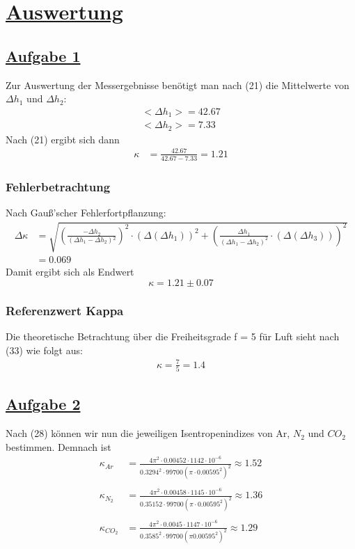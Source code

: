 \documentclass[11pt,a4paper]{article}
\begin{document}
  \section{\underline{Auswertung}}
\subsection{\underline{Aufgabe 1}}
Zur Auswertung der Messergebnisse benötigt man nach (21) die Mittelwerte von $\Delta h_{1} $ und $\Delta h_{2}$:
\begin{align*}
  <\Delta h_{1}> = 42.67 \\
  <\Delta h_{2}> = 7.33
\end{align*}
Nach (21) ergibt sich dann
\begin{align*}
  \kappa &= \frac{42.67}{42.67-7.33} = 1.21
\end{align*}
\subsubsection{Fehlerbetrachtung}
Nach Gauß'scher Fehlerfortpflanzung:
\begin{align*}
    \Delta \kappa &= \sqrt{{\left(\frac{- \Delta h_{2}}{{(\Delta h_{1}-\Delta
    h_{2})}{^2}}\right)}^{2} \cdot {(\Delta(\Delta h_{1}))}^{2}+{\left(\frac{\Delta
    h_{1}}{{(\Delta h_{1} - \Delta h_{2})}^{2}}\cdot (\Delta(\Delta h_{3}))\right)}^{2}}\\
&= 0.069
\end{align*}
Damit ergibt sich als Endwert
\begin{equation*}
  \kappa = 1.21 \pm 0.07
\end{equation*}

\subsubsection{Referenzwert Kappa}
Die theoretische Betrachtung über die Freiheitsgrade f = 5 für Luft sieht nach
(33) wie folgt aus:
\begin{align*}
    \kappa = \frac{7}{5} = 1.4
\end{align*}
\subsection{\underline{Aufgabe 2}}
 Nach (28) k\"onnen wir nun die jeweiligen Isentropenindizes von Ar, $N_{2}$ und $CO_{2}$
 bestimmen. Demnach ist 
 \begin{align*}
     {\kappa}_{Ar} &=\frac{4{\pi}^{2}\cdot0.00452\cdot1142\cdot{10}^{-6}}
     {{0.3294}^{2}\cdot99700{(\pi\cdot{0.00595}^{2})}^{2}} \approx 1.52 \\ \\
     {\kappa}_{{N}_{2}} &= \frac{4{\pi}^{2}\cdot0.00458\cdot1145\cdot{10}^{-6}}
     {{0.3515}{2}\cdot99700{(\pi\cdot{0.00595}^{2})}^{2}} \approx 1.36 \\ \\
     {\kappa}_{{CO}_{2}} &= \frac{4{\pi}^{2}\cdot0.0045\cdot1147\cdot{10}^{-6}}
     {{0.3585}^{2}\cdot99700{(\pi{0.00595}^{2})}^{2}} \approx 1.29
 \end{align*}
\end{document}
